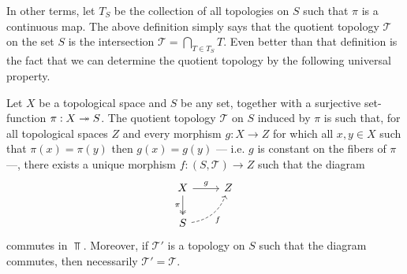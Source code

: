 In other terms, let \(T_S\) be the collection of all topologies on \(S\) such
that \(\pi\) is a continuous map. The above definition simply says that the
quotient topology \(\mathcal T\) on the set \(S\) is the intersection \(\mathcal
T = \bigcap_{T \in T_S}T\). Even better than that definition is the fact that we
can determine the quotient topology by the following universal property.

\begin{theorem}
\label{thm:universal-property-quotient-topology}
Let \(X\) be a topological space and \(S\) be any set, together with a
surjective set-function \(\pi: X \twoheadrightarrow S\). The quotient topology \(\mathcal T\)
on \(S\) induced by \(\pi\) is such that, for all topological spaces \(Z\) and
every morphism \(g: X \to Z\) for which all \(x, y \in X\) such that \(\pi(x) =
\pi(y)\) then \(g(x) = g(y)\) --- i.e. \(g\) is constant on the fibers of
\(\pi\) ---, there exists a unique morphism \(f: (S, \mathcal T) \to Z\) such
that the diagram
\[
  \begin{tikzcd}
    X \ar[r, "g"] \ar[d, two heads, swap, "\pi"] &Z\\
    S \ar[ur, swap, bend right, dashed, "f"]
  \end{tikzcd}
\]
commutes in \(\Top\). Moreover, if \(\mathcal T'\) is a topology on \(S\) such
that the diagram commutes, then necessarily \(\mathcal T' = \mathcal T\).
\end{theorem}

